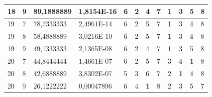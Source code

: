 \documentclass[conference]{IEEEtran}
\begin{document}
\begin{table}[]
\begin{tabular}{|llll|llllllll|}
		\multicolumn{1}{|l|}{18}  & \multicolumn{1}{l|}{9}         & \multicolumn{1}{l|}{89,1888889}    & 1,8154E-16 & \multicolumn{1}{l|}{6}   & \multicolumn{1}{l|}{2}          & \multicolumn{1}{l|}{4}          & \multicolumn{1}{l|}{7}   & \multicolumn{1}{l|}{\textbf{1}} & \multicolumn{1}{l|}{3}          & \multicolumn{1}{l|}{5}          & 8                      \\ \hline
		\multicolumn{1}{|l|}{19}  & \multicolumn{1}{l|}{7}         & \multicolumn{1}{l|}{78,7333333}    & 2,4961E-14 & \multicolumn{1}{l|}{6}   & \multicolumn{1}{l|}{2}          & \multicolumn{1}{l|}{5}          & \multicolumn{1}{l|}{7}   & \multicolumn{1}{l|}{\textbf{1}} & \multicolumn{1}{l|}{3}          & \multicolumn{1}{l|}{4}          & 8                      \\ \hline
		\multicolumn{1}{|l|}{19}  & \multicolumn{1}{l|}{8}         & \multicolumn{1}{l|}{58,4888889}    & 3,0216E-10 & \multicolumn{1}{l|}{6}   & \multicolumn{1}{l|}{2}          & \multicolumn{1}{l|}{5}          & \multicolumn{1}{l|}{7}   & \multicolumn{1}{l|}{\textbf{1}} & \multicolumn{1}{l|}{3}          & \multicolumn{1}{l|}{4}          & 8                      \\ \hline
		\multicolumn{1}{|l|}{19}  & \multicolumn{1}{l|}{9}         & \multicolumn{1}{l|}{49,1333333}    & 2,1365E-08 & \multicolumn{1}{l|}{6}   & \multicolumn{1}{l|}{2}          & \multicolumn{1}{l|}{4}          & \multicolumn{1}{l|}{7}   & \multicolumn{1}{l|}{\textbf{1}} & \multicolumn{1}{l|}{3}          & \multicolumn{1}{l|}{5}          & 8                      \\ \hline
		\multicolumn{1}{|l|}{20}  & \multicolumn{1}{l|}{7}         & \multicolumn{1}{l|}{44,8444444}    & 1,4661E-07 & \multicolumn{1}{l|}{6}   & \multicolumn{1}{l|}{2}          & \multicolumn{1}{l|}{5}          & \multicolumn{1}{l|}{7}   & \multicolumn{1}{l|}{3}          & \multicolumn{1}{l|}{4}          & \multicolumn{1}{l|}{\textbf{1}} & 8                      \\ \hline
		\multicolumn{1}{|l|}{20}  & \multicolumn{1}{l|}{8}         & \multicolumn{1}{l|}{42,6888889}    & 3,8302E-07 & \multicolumn{1}{l|}{5}   & \multicolumn{1}{l|}{3}          & \multicolumn{1}{l|}{6}          & \multicolumn{1}{l|}{7}   & \multicolumn{1}{l|}{2}          & \multicolumn{1}{l|}{\textbf{1}} & \multicolumn{1}{l|}{4}          & 8                      \\ \hline
		\multicolumn{1}{|l|}{20}  & \multicolumn{1}{l|}{9}         & \multicolumn{1}{l|}{26,1222222}    & 0,00047896 & \multicolumn{1}{l|}{6}   & \multicolumn{1}{l|}{4}          & \multicolumn{1}{l|}{\textbf{1}} & \multicolumn{1}{l|}{8}   & \multicolumn{1}{l|}{2}          & \multicolumn{1}{l|}{3}          & \multicolumn{1}{l|}{5}          & 7                      \\ \hline
	\end{tabular}
\end{table}
\end{document}
